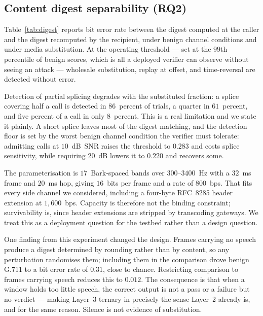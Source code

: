 \subsection{Content digest separability (RQ2)}

Table~\ref{tab:digest} reports bit error rate between the digest computed at
the caller and the digest recomputed by the recipient, under benign channel
conditions and under media substitution. At the operating threshold --- set at
the $99$th percentile of benign scores, which is all a deployed verifier can
observe without seeing an attack --- wholesale substitution, replay at offset,
and time-reversal are detected without error.

Detection of partial splicing degrades with the substituted fraction: a splice
covering half a call is detected in $86$~percent of trials, a quarter in
$61$~percent, and five percent of a call in only $8$~percent. This is a real
limitation and we state it plainly. A short splice leaves most of the digest
matching, and the detection floor is set by the worst benign channel condition
the verifier must tolerate: admitting calls at $10$~dB~SNR raises the threshold
to $0.283$ and costs splice sensitivity, while requiring $20$~dB lowers it to
$0.220$ and recovers some.

The parameterisation is $17$~Bark-spaced bands over $300$--$3400$~Hz with a
$32$~ms frame and $20$~ms hop, giving $16$~bits per frame and a rate of
$800$~bps. That fits every side channel we considered, including a four-byte
RFC~8285 header extension at $1{,}600$~bps. Capacity is therefore not the
binding constraint; survivability is, since header extensions are stripped by
transcoding gateways. We treat this as a deployment question for the testbed
rather than a design question.

One finding from this experiment changed the design. Frames carrying no speech
produce a digest determined by rounding rather than by content, so any
perturbation randomises them; including them in the comparison drove benign
G.711 to a bit error rate of $0.31$, close to chance. Restricting comparison to
frames carrying speech reduces this to $0.012$. The consequence is that when a
window holds too little speech, the correct output is not a pass or a failure
but no verdict --- making Layer~3 ternary in precisely the sense Layer~2
already is, and for the same reason. Silence is not evidence of substitution.

